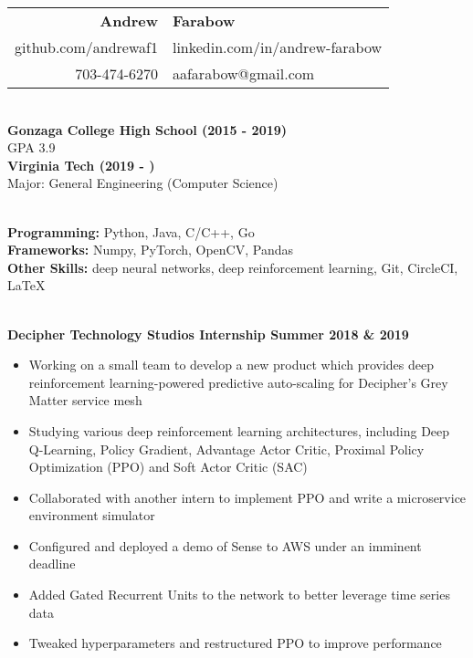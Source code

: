 \documentclass{article}
\begin{document}
  \begin{center}
    \begin{tabular}{r l}
      {\huge\textbf{Andrew}} & {\huge\textbf{Farabow}} \\
      \hspace{35pt} github.com/andrewaf1 & linkedin.com/in/andrew-farabow \\
      703-474-6270 & aafarabow@gmail.com \\
    \end{tabular}


  \begin{flushleft}
    \begin{multicols}{2}
      {\large\textbf{\underline{}}} \\
      \textbf{Gonzaga College High School	(2015 - 2019)} \\
      GPA 3.9 \\
      \textbf{Virginia Tech	(2019 - )} \\
      Major: General Engineering (Computer Science)

    \columnbreak
    {\large\textbf{\underline{}}} \\
    {\textbf{Programming:}} Python, Java, C/C++, Go \\
    {\textbf{Frameworks:}} Numpy, PyTorch, OpenCV, Pandas \\
    {\textbf{Other Skills:}} deep neural networks, deep reinforcement learning, Git, CircleCI, LaTeX \\

    \end{multicols}

    {\large\textbf{\underline{}}} \\
    \textbf{Decipher Technology Studios Internship \hfill Summer 2018 \& 2019}
    \begin{itemize}
      \item Working on a small team to develop a new product which provides deep reinforcement learning-powered predictive auto-scaling for Decipher's Grey Matter service mesh
      \item Studying various deep reinforcement learning architectures, including Deep Q-Learning, Policy Gradient, Advantage Actor Critic, Proximal Policy Optimization (PPO) and Soft Actor Critic (SAC)
      \item Collaborated with another intern to implement PPO and write a microservice environment simulator
      \item Configured and deployed a demo of Sense to AWS under an imminent deadline
      \item Added Gated Recurrent Units to the network to better leverage time series data
      \item Tweaked hyperparameters and restructured PPO to improve performance
    \end{itemize}



\end{flushleft}
\end{center}
\end{document}
